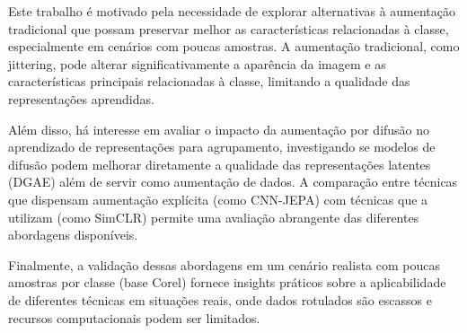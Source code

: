 Este trabalho é motivado pela necessidade de explorar alternativas à aumentação tradicional que possam preservar melhor as características relacionadas à classe, especialmente em cenários com poucas amostras. A aumentação tradicional, como jittering, pode alterar significativamente a aparência da imagem e as características principais relacionadas à classe, limitando a qualidade das representações aprendidas.

Além disso, há interesse em avaliar o impacto da aumentação por difusão no aprendizado de representações para agrupamento, investigando se modelos de difusão podem melhorar diretamente a qualidade das representações latentes (DGAE) além de servir como aumentação de dados. A comparação entre técnicas que dispensam aumentação explícita (como CNN-JEPA) com técnicas que a utilizam (como SimCLR) permite uma avaliação abrangente das diferentes abordagens disponíveis.

Finalmente, a validação dessas abordagens em um cenário realista com poucas amostras por classe (base Corel) fornece insights práticos sobre a aplicabilidade de diferentes técnicas em situações reais, onde dados rotulados são escassos e recursos computacionais podem ser limitados.
